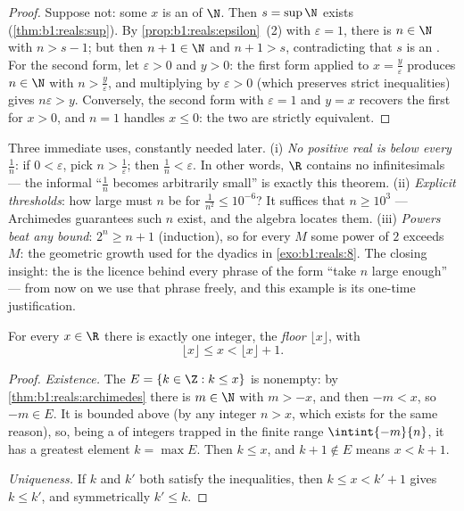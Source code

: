 \begin{proof}
Suppose not: some $x$ is an  of $\N$. Then $s = \sup \N$
exists (\cref{thm:b1:reals:sup}). By
\cref{prop:b1:reals:epsilon}~(2) with $\varepsilon = 1$, there is $n
\in \N$ with $n > s - 1$; but then $n + 1 \in \N$ and $n + 1 > s$,
contradicting that $s$ is an . For the second form,
let $\varepsilon > 0$ and $y > 0$: the first form applied to $x
= \frac{y}{\varepsilon}$ produces $n \in \N$ with $n >
\frac{y}{\varepsilon}$, and multiplying by $\varepsilon > 0$
(which preserves strict inequalities) gives $n\varepsilon > y$.
Conversely, the second form with $\varepsilon = 1$ and $y = x$
recovers the first for $x > 0$, and $n = 1$ handles $x \leq 0$:
the two  are strictly equivalent.
\end{proof}

\begin{example}\label{ex:b1:reals:archimedeswork}
Three immediate uses, constantly needed later. (i) \emph{No
positive real is below every $\frac1n$}: if $0 < \varepsilon$,
pick $n > \frac1\varepsilon$; then $\frac1n < \varepsilon$. In
other words, $\R$ contains no infinitesimals --- the informal
``$\frac1n$ becomes arbitrarily small'' is exactly this theorem.
(ii) \emph{Explicit thresholds}: how large must $n$ be for
$\frac{1}{n^2} \leq 10^{-6}$? It suffices that $n \geq 10^3$
--- Archimedes guarantees such $n$ exist, and the algebra
locates them. (iii) \emph{Powers beat any bound}: $2^n \geq n +
1$ (induction), so for every $M$ some power of $2$ exceeds $M$:
the geometric growth used for the dyadics in
\cref{exo:b1:reals:8}. The closing insight: the  is the licence behind every phrase of the form ``take
$n$ large enough'' --- from now on we use that phrase freely,
and this example is its one-time justification.
\end{example}

\begin{theorem}\label{thm:b1:reals:floor}
For every $x \in \R$ there is exactly one integer, the
\emph{floor} $\lfloor x \rfloor$, with
\[
\lfloor x \rfloor \leq x < \lfloor x \rfloor + 1 .
\]
\end{theorem}

\begin{proof}
\emph{Existence.} The  $E = \{k \in \Z : k \leq x\}$ is nonempty:
by \cref{thm:b1:reals:archimedes} there is $m \in \N$ with $m > -x$,
and then $-m < x$, so $-m \in E$. It is bounded above (by any integer
$n > x$, which exists for the same reason), so, being a  of
integers trapped in the finite range $\intint{-m}{n}$, it has a
greatest element $k = \max E$. Then $k \leq x$, and $k + 1 \notin E$
means $x < k + 1$.

\emph{Uniqueness.} If $k$ and $k'$ both satisfy the inequalities,
then $k \leq x < k' + 1$ gives $k \leq k'$, and symmetrically $k'
\leq k$.
\end{proof}

